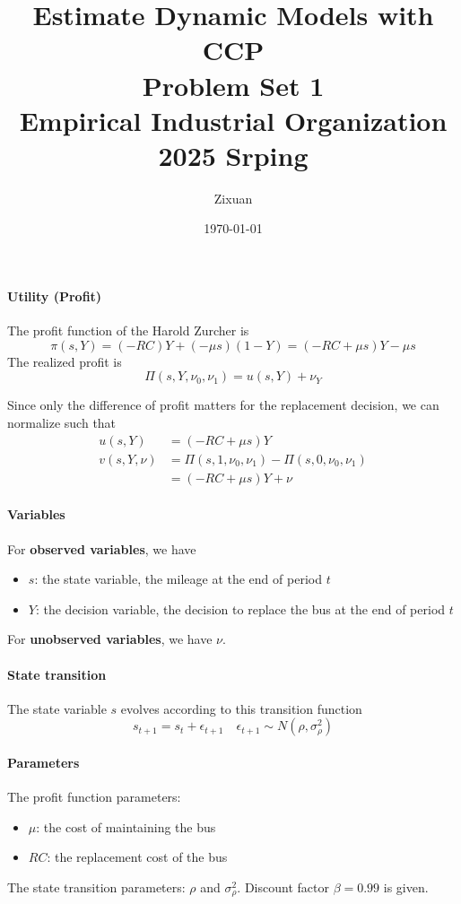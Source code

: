 \documentclass[12pt]{article}[margin=1in]
\title{\textbf{Estimate Dynamic Models with CCP} \\
    \vspace{.3cm}
    \large Problem Set 1 \\
    Empirical Industrial Organization 2025 Srping}
\author{Zixuan}
\date{\today}
\begin{document}
\maketitle

\setcounter{page}{1}

\paragraph{Utility (Profit)}
The profit function of the Harold Zurcher is
\begin{equation*}
    \pi(s,Y) = (-RC)Y + (-\mu s)(1 - Y) = (-RC + \mu s)Y - \mu s
\end{equation*}
The realized profit is
\begin{equation*}
    \Pi(s,Y,\nu_0,\nu_1) = u(s,Y) + \nu_Y
\end{equation*}

Since only the difference of profit matters for the replacement decision, we
can normalize such that
\begin{align*}
    u(s,Y)      & = (-RC + \mu s)Y                              \\
    v(s,Y, \nu) & =  \Pi(s,1,\nu_0,\nu_1) -\Pi(s,0,\nu_0,\nu_1) \\
                & = (-RC + \mu s)Y + \nu
\end{align*}

\paragraph{Variables} For \textbf{observed variables}, we have
\begin{itemize}
    \item $s$: the state variable, the mileage at the end of period $t$
    \item $Y$: the decision variable, the decision to replace the bus at the end of period $t$
\end{itemize}
For \textbf{unobserved variables}, we have $\nu$.
\paragraph{State transition} The state variable $s$ evolves according to this transition function
\begin{equation*}
    s_{t+1} = s_t + \epsilon_{t+1} \quad \epsilon_{t+1} \sim N(\rho, \sigma_{\rho}^2)
\end{equation*}
\paragraph{Parameters} The profit function parameters:
\begin{itemize}
    \item $\mu$: the cost of maintaining the bus
    \item $RC$: the replacement cost of the bus
\end{itemize}
The state transition parameters: $\rho$ and $\sigma_{\rho}^2$.
Discount factor $\beta=0.99$ is given.
\end{document}
